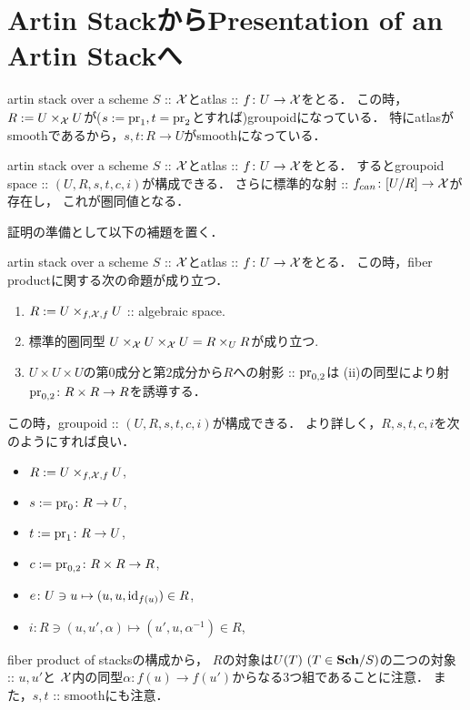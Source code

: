 \section{Artin StackからPresentation of an Artin Stackへ}
    artin stack over a scheme $S$ :: $\stX$とatlas :: $f \colon U \to \stX$をとる．
    この時，$R:=U \times_{\stX} U$が($s:=\pr_1, t=\pr_2$とすれば)groupoidになっている．
    特にatlasがsmoothであるから，$s,t \colon R \to U$がsmoothになっている．

    \begin{Thm}[\cite{SP} 04T4, 04T5]
        artin stack over a scheme $S$ :: $\stX$とatlas :: $f \colon U \to \stX$をとる．
        するとgroupoid space :: $(U, R, s,t,c,i)$が構成できる．
        さらに標準的な射 :: $f_{can} \colon [U/R] \to \stX$が存在し，
        これが圏同値となる．
    \end{Thm}

    証明の準備として以下の補題を置く．

    \begin{Lemma}[\cite{SP} 04T4 (1)--(3)]\label{lemm:fiberprod}
        artin stack over a scheme $S$ :: $\stX$とatlas :: $f \colon U \to \stX$をとる．
        この時，fiber productに関する次の命題が成り立つ．
        \begin{enumerate}
            \item
                $R:=U \times_{f,\stX,f} U$ :: algebraic space.
            \item
                標準的圏同型 $U \times_{\stX} U \times_{\stX} U=R \times_{U} R$が成り立つ.
            \item
                $U \times U \times U$の第$0$成分と第$2$成分から$R$への射影 :: $\pr_{0,2}$は
                (ii)の同型により射$\pr_{0,2} \colon R \times R \to R$を誘導する．
        \end{enumerate}
    \end{Lemma}

    \begin{Lemma}[\cite{SP} 04T4 (4), 04T5 (1)]
        この時，groupoid :: $(U, R, s,t,c,i)$が構成できる．
        より詳しく，$R, s,t,c,i$を次のようにすれば良い．
        \begin{itemize}
            \item $R:=U \times_{f,\stX,f} U$,
            \item $s:=\pr_0 \colon R \to U$,
            \item $t:=\pr_1 \colon R \to U$,
            \item $c:=\pr_{0,2} \colon R \times R \to R$,
            \item $e \colon U \ni u  \mapsto (u,u,\id[f(u)]) \in R$,
            \item $i \colon R \ni (u,u',\alpha) \mapsto (u',u,\alpha^{-1}) \in R$,
        \end{itemize}
        fiber product of stacksの構成から，
        $R$の対象は$U(T)\ (T \in \Sch/S)$の二つの対象 :: $u, u'$と
        $\stX$内の同型$\alpha \colon f(u) \to f(u')$からなる$3$つ組であることに注意．
        また，$s,t$ :: smoothにも注意．
    \end{Lemma}

